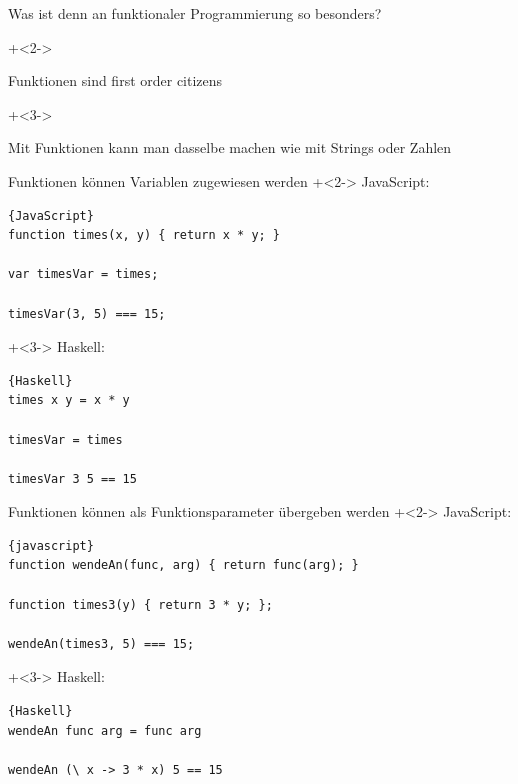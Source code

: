 \begin{frame}[fragile]{Was ist denn an funktionaler Programmierung so besonders?}

\onslide+<2->
\begin{center}
\Large
Funktionen sind \glqq{}first order citizens\grqq{}
\end{center}

\vspace{2em}

\onslide+<3->
\begin{center}
Mit Funktionen kann man dasselbe machen wie mit Strings oder Zahlen
\end{center}

\end{frame}

\begin{frame}[fragile]{Funktionen können Variablen zugewiesen werden}
\onslide+<2->
JavaScript:
\begin{lstlisting}{JavaScript}
function times(x, y) { return x * y; }

var timesVar = times;
    
timesVar(3, 5) === 15;
\end{lstlisting}

\onslide+<3->
Haskell:
\begin{lstlisting}{Haskell}
times x y = x * y

timesVar = times

timesVar 3 5 == 15
\end{lstlisting}

\end{frame}

\begin{frame}[fragile]{Funktionen können als Funktionsparameter übergeben werden}
\onslide+<2->
JavaScript:
\begin{lstlisting}{javascript}
function wendeAn(func, arg) { return func(arg); }

function times3(y) { return 3 * y; };

wendeAn(times3, 5) === 15;
\end{lstlisting}

\onslide+<3->
Haskell:
\begin{lstlisting}{Haskell}
wendeAn func arg = func arg

wendeAn (\ x -> 3 * x) 5 == 15
\end{lstlisting}

\end{frame}

